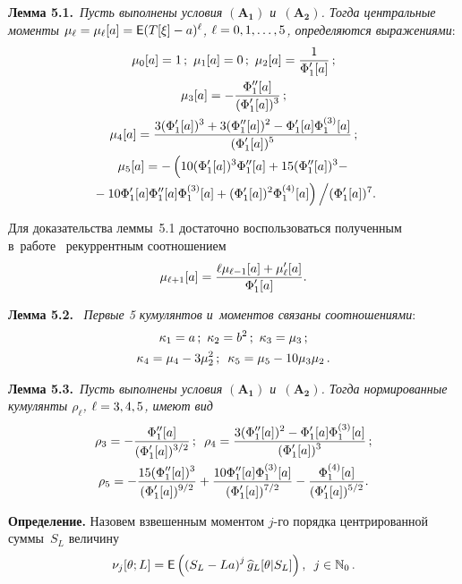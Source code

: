 \begin{multicols}{2}
\noindent
\textbf{Лемма 5.1.}\
\textit{Пусть выполнены условия $\mathbf{(A_1)}$ и~$\mathbf{(A_2)}$. Тогда
 центральные моменты $\mu_\ell\hm=\mu_\ell[a]\hm=\Ep(T[\xi]-a)^\ell$, 
 $\ell\hm = 0,1,\ldots,5$, определяются выражениями}:
 \begin{gather*}
\mu_0[a]=1\,;\
 \mu_1[a]=0\,;\
 \mu_2[a]=\fr{1}{\Phi_1'[a]}\,;\\
 \mu_3[a]= -\fr{\Phi_1''[a]}{(\Phi_1'[a])^3}\,;
\\
\mu_4[a]= \fr{3 (\Phi_1'[a])^3+3 (\Phi_1''[a])^2
         -\Phi_1'[a] \Phi_1^{(3)}[a]}{(\Phi_1'[a])^5}\,;
\\
\mu_5[a]= -\left(\vphantom{\Phi_1^{(4)}}
10 (\Phi_1'[a])^3 \Phi_1''[a]+15 (\Phi_1''[a])^3
         -\right.\\
         \left.{}-10 \Phi_1'[a] \Phi_1''[a] \Phi_1^{(3)}[a]
         +(\Phi_1'[a])^2 \Phi_1^{(4)}[a]\right)\Big /
         (\Phi_1'[a])^7.
 \end{gather*}

  Для доказательства леммы~5.1 достаточно воспользоваться полученным в~работе~\cite{6-ch} рекуррентным соотношением
 \begin{equation*}
 \mu_{\ell+1}[a]=\displaystyle\frac{\displaystyle \ell\mu_{\ell-1}[a]+\mu_\ell'[a]\mathstrut}{\displaystyle \Phi_1'[a]\mathstrut}.
  \end{equation*}

\noindent
\textbf{Лемма 5.2.}\
\textit{ Первые 5 кумулянтов и~моментов связаны соотношениями}:
 \begin{gather*}
 \kappa_1=a\,;\ \kappa_2 = b^2 \,;\ \kappa_3 = \mu _3\,;\\
 \kappa_4 = \mu_4  - 3\mu_2^2\,;\enskip  \kappa_5  = \mu_5 - 10\mu_3 \mu_2\,.
 \end{gather*}


\noindent
\textbf{Лемма 5.3.}\
\textit{Пусть выполнены условия $\mathbf{(A_1)}$ и~$\mathbf{(A_2)}$. Тогда
 нормированные кумулянты $\rho_\ell$, $\ell \hm= 3,4,5$, имеют вид}
 \begin{gather*}
 \rho_3= -\displaystyle\frac{\displaystyle \Phi_1''[a]\mathstrut}{\displaystyle (\Phi_1'[a])^{3/2}\mathstrut}\,; \enskip
 \rho_4= \displaystyle\frac{\displaystyle 3 (\Phi_1''[a])^2 -\Phi_1'[a]\Phi_1^{(3)}[a]\mathstrut}{\displaystyle (\Phi_1'[a])^3\mathstrut}\,; \\
   \rho_5= -\displaystyle\frac{\displaystyle 15 (\Phi_1''[a])^3\mathstrut}{\displaystyle (\Phi_1'[a])^{9/2}\mathstrut}
 +\displaystyle\frac{\displaystyle 10 \Phi_1''[a] \Phi_1^{(3)}[a]\mathstrut}{\displaystyle (\Phi_1'[a])^{7/2}\mathstrut}
 -\displaystyle\frac{\displaystyle \Phi_1^{(4)}[a]\mathstrut}{\displaystyle (\Phi_1'[a])^{5/2}\mathstrut}.
 \end{gather*}

 \noindent
 \textbf{Определение.} Назовем взвешенным моментом
 $j$-го порядка центрированной суммы~$S_L$ величину
 \begin{equation}
 \nu_j[\theta;L]={\sf E}\left( \left( S_L - La\right)^j \widehat{g}_{L}[\theta|S_L]
 \right),\enskip j\in\mathbb{N}_0\,.
 \label{5.1}
 \end{equation}


\end{multicols}
